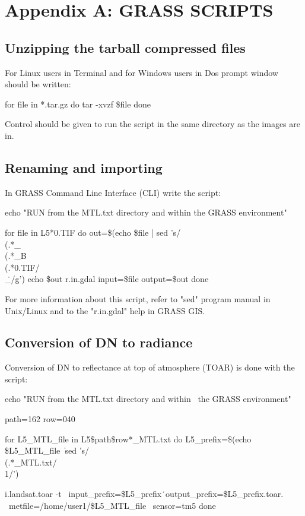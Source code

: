 \newpage


\section{Appendix A: GRASS SCRIPTS}
\label{appendixA}

\subsection{Unzipping the tarball compressed files}

For Linux users in Terminal and for Windows users in Dos prompt window should be written:\newline

\begin{smallverbatim}
for file in *.tar.gz
do
tar -xvzf \$file
done
\end{smallverbatim}

Control should be given to run the script in the same directory as the images are in.\newline

\subsection{Renaming and importing}
In GRASS Command Line Interface (CLI) write the script:

\begin{smallverbatim}
echo "RUN from the MTL.txt directory and within the GRASS environment"

for file in L5*0.TIF
do
	out=\$(echo \$file | sed 's/\\(.*\)\_\\(.*\)\_B\\(.*\)0.TIF/\1\\_\2\.\3/g')
	echo \$out
	r.in.gdal input=\$file output=\$out
done
\end{smallverbatim}

For more information about this script, refer to "sed" program manual in Unix/Linux and to the "r.in.gdal" help in GRASS GIS.
 
\subsection{Conversion of DN to radiance}
Conversion of DN to reflectance at top of atmosphere (TOAR) is done with the script:

\begin{smallverbatim}
echo "RUN from the MTL.txt directory and within \
 the GRASS environment"

path=162
row=040

for L5_MTL_file in L5\$path\$row*_MTL.txt
do
	L5_prefix=\$(echo \$L5_MTL_file \| \
	  sed 's/\\(.*\)_MTL.txt/\\1/')

	i.landsat.toar -t \
	  input_prefix=\$L5_prefix\. \
	  output_prefix=\$L5_prefix.toar.  \
	  metfile=/home/user1/\$L5\_MTL\_file \
	  sensor=tm5
done
\end{smallverbatim}



